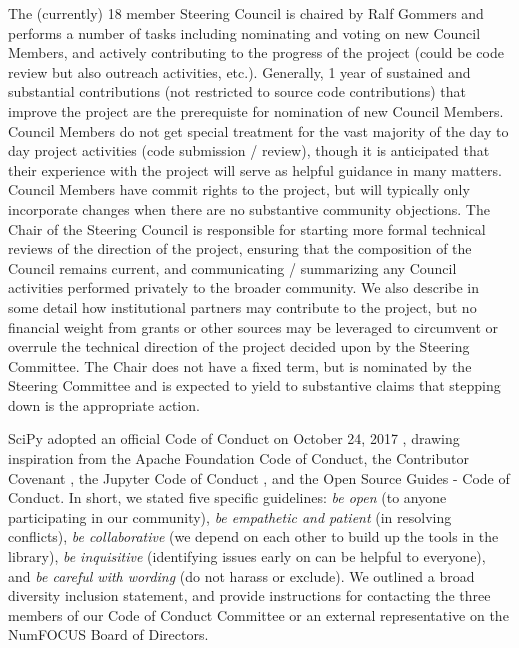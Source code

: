 \documentclass[fleqn,10pt]{wlscirep}
\begin{document}
The (currently) 18 member Steering Council is chaired by Ralf Gommers and performs a number of
tasks including nominating and voting on new Council Members, and actively
contributing to the progress of the project (could be code review but also
outreach activities, etc.). Generally, 1 year of sustained and substantial
contributions (not restricted to source code contributions) that improve
the project are the prerequiste for nomination of new Council Members. Council
Members do not get special treatment for the vast majority of the day to day
project activities (code submission / review), though it is anticipated that their
experience with the project will serve as helpful guidance in many matters.
Council Members have commit rights to the project, but will typically only
incorporate changes when there are no substantive community objections. The
Chair of the Steering Council is responsible for starting more formal
technical reviews of the direction of the project, ensuring that the
composition of the Council remains current, and communicating / summarizing
any Council activities performed privately to the broader community. We also
describe in some detail how institutional partners may contribute to the
project, but no financial weight from grants or other sources
may be leveraged to circumvent or overrule the technical direction of the
project decided upon by the Steering Committee. The Chair does not have
a fixed term, but is nominated by the Steering Committee and is expected
to yield to substantive claims that stepping down is the appropriate action.

SciPy adopted an official Code of Conduct on October 24, 2017
\cite{SciPyCodeOfConduct}, drawing
inspiration from the Apache Foundation Code of
Conduct\cite{ApacheCodeOfConduct}, the Contributor Covenant
\cite{ContributorConvenant},
the Jupyter Code of Conduct \cite{Jupyter_COC}, and the Open Source Guides -
Code of Conduct\cite{OSG_COC}. In short,
we stated five specific guidelines: \emph{be open} (to anyone participating in our community),
\emph{be empathetic and patient} (in resolving conflicts), \emph{be collaborative} (we depend
on each other to build up the tools in the library), \emph{be inquisitive} (identifying issues
early on can be helpful to everyone), and \emph{be careful with wording} (do not harass or exclude).
We outlined a broad diversity inclusion statement, and provide
instructions for contacting the three members of our Code of Conduct Committee or an
external representative on the NumFOCUS Board of Directors.
\end{document}
